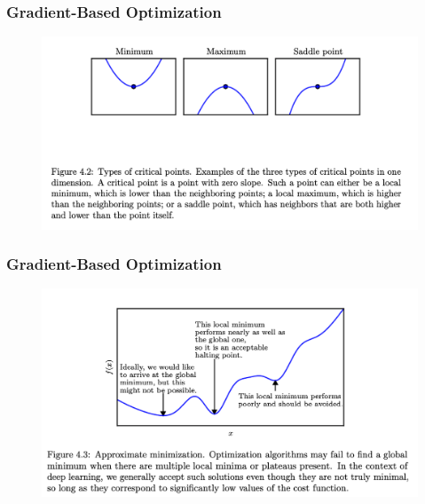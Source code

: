 \documentclass[
  shownotes,
  xcolor={svgnames},
  hyperref={colorlinks,citecolor=DarkBlue,linkcolor=DarkRed,urlcolor=DarkBlue}
  , aspectratio=169]{beamer}
\begin{document}
\begin{frame}[fragile]
\frametitle{Gradient-Based Optimization}



\begin{figure}[H] \centering
            \captionsetup{justification=centering}
              \includegraphics[scale=0.4]{figures/gradient_descent_2}
 \end{figure}
 
 \end{frame}
\begin{frame}[fragile]
\frametitle{Gradient-Based Optimization}



\begin{figure}[H] \centering
            \captionsetup{justification=centering}
              \includegraphics[scale=0.4]{figures/gradient_descent_3}
 \end{figure}
 
  \end{frame}
\end{document}
